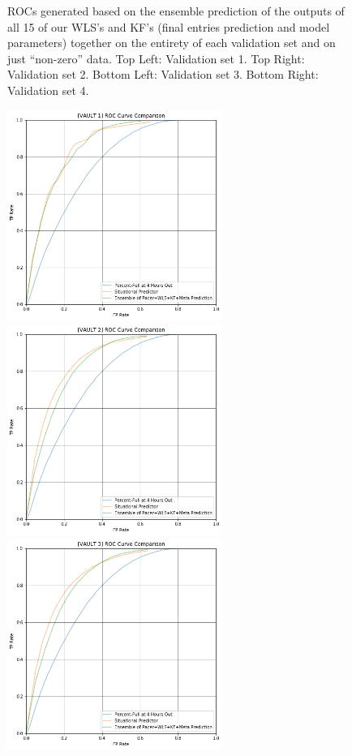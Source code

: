 \begin{figure}[h]
\caption{ROCs generated based on the ensemble prediction of the outputs of all 15 of our WLS's and KF's (final entries prediction and model parameters) together on the entirety of each validation set and on just ``non-zero'' data. Top Left: Validation set 1. Top Right: Validation set 2. Bottom Left: Validation set 3. Bottom Right: Validation set 4.}
\label{fig:theSituation}
\end{figure}

\pagebreak

\begin{figure}[h]
\centering
\includegraphics[width=7cm]{body/results/Graphs/SituationalPredictions/Compare/v1.png}
\includegraphics[width=7cm]{body/results/Graphs/SituationalPredictions/Compare/v2.png}
\includegraphics[width=7cm]{body/results/Graphs/SituationalPredictions/Compare/v3.png}

\end{figure}
